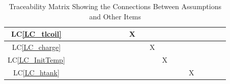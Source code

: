 \documentclass[12pt]{article}
\newcommand{\lcref}[1]{LC\ref{#1}}
\begin{document}
{\begin{landscape}
\begin{table}[h!]
\begin{tabular}{|c|c|c|c|c|c|c|c|c|c|c|c|c|c|c|c|c|c|c|c|}
        \lcref{LC_tlcoil}   &                            &                 &                &               &                        &                  &                    &                & X               &                   &                 &                   &                     &                  &                &                   &               &                    &                   \\ \hline
        \lcref{LC_charge}   &                            &                 &                &               &                        &                  &                    &                &                 &                   & X               &                   &                     &                  &                &                   &               &                    &                   \\ \hline
        \lcref{LC_InitTemp} &                            &                 &                &               &                        &                  &                    &                &                 &                   &                 & X                 &                     &                  &                &                   &               &                    &                   \\ \hline
        \lcref{LC_htank}    &                            &                 &                &               &                        &                  &                    &                &                 &                   &                 &                   &                     &                  & X              &                   &               &                    &                   \\
        \hline
      \end{tabular}
      \caption{Traceability Matrix Showing the Connections Between Assumptions and Other Items}
      \label{Table:A_trace}
    \end{table}
  \end{landscape}
}
\end{document}
